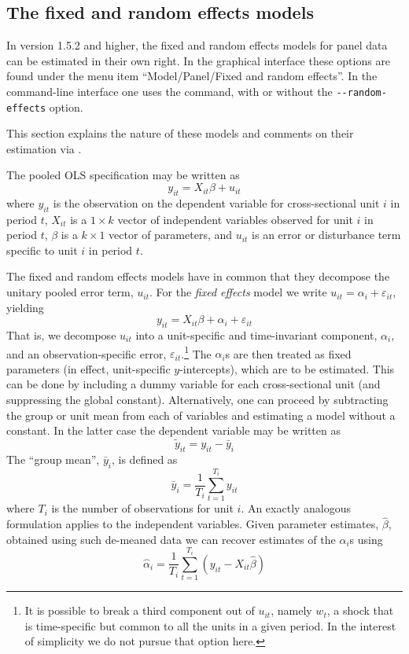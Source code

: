 \subsection{The fixed and random effects models}
\label{panel-est}

In  version 1.5.2 and higher, the fixed and random effects
models for panel data can be estimated in their own right.  In the
graphical interface these options are found under the menu item
``Model/Panel/Fixed and random effects''.  In the command-line
interface one uses the  command, with or without the
\verb+--random-effects+ option.

This section explains the nature of these models and comments on their
estimation via .

The pooled OLS specification may be written as 
\begin{equation}
\label{eq:pooled}
y_{it} = X_{it}\beta + u_{it}
\end{equation}
where $y_{it}$ is the observation on the dependent variable for
cross-sectional unit $i$ in period $t$, $X_{it}$ is a $1\times k$
vector of independent variables observed for unit $i$ in period $t$,
$\beta$ is a $k\times 1$ vector of parameters, and $u_{it}$ is an error
or disturbance term specific to unit $i$ in period $t$.

The fixed and random effects models have in common that they decompose
the unitary pooled error term, $u_{it}$.  For the \textsl{fixed effects}
model we write $u_{it} = \alpha_i + \varepsilon_{it}$, yielding
\begin{equation}
\label{eq:FE}
y_{it} = X_{it}\beta + \alpha_i + \varepsilon_{it}
\end{equation}
That is, we decompose $u_{it}$ into a unit-specific and time-invariant
component, $\alpha_i$, and an observation-specific error,
$\varepsilon_{it}$.\footnote{It is possible to break a third component
  out of $u_{it}$, namely $w_t$, a shock that is time-specific but
  common to all the units in a given period.  In the interest of
  simplicity we do not pursue that option here.}  The $\alpha_i$s are
then treated as fixed parameters (in effect, unit-specific
$y$-intercepts), which are to be estimated.  This can be done by
including a dummy variable for each cross-sectional unit (and
suppressing the global constant).  Alternatively, one can proceed by
subtracting the group or unit mean from each of variables and
estimating a model without a constant.  In the latter case the
dependent variable may be written as
\[
\tilde{y}_{it} = y_{it} - \bar{y}_i
\]
The ``group mean'', $\bar{y}_i$, is defined as
\[
\bar{y}_i = \frac{1}{T_i} \sum_{t=1}^{T_i} y_{it}
\]
where $T_i$ is the number of observations for unit $i$.  An exactly
analogous formulation applies to the independent variables.  Given
parameter estimates, $\hat{\beta}$, obtained using such de-meaned data
we can recover estimates of the $\alpha_i$s using
\[
\hat{\alpha}_i = \frac{1}{T_i} \sum_{t=1}^{T_i} 
   \left(y_{it} - X_{it}\hat{\beta}\right)
\]

